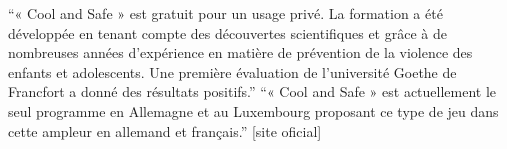 ``« Cool and Safe » est gratuit pour un usage privé. La formation a été développée en tenant compte des découvertes scientifiques et grâce à de nombreuses années d'expérience en matière de prévention de la violence des enfants et adolescents. Une première évaluation de l'université Goethe de Francfort a donné des résultats positifs.'' ``« Cool and Safe » est actuellement le seul programme en Allemagne et au Luxembourg proposant ce type de jeu dans cette ampleur en allemand et français.'' [site oficial]









\cite{muller2014child}

\cite{pajalakasvatustieteiden}


